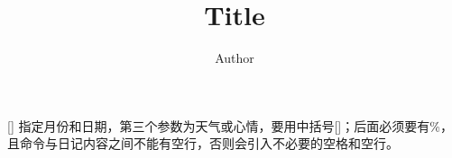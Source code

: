 \documentclass{diary}
\author{Author}
\title{Title}
\begin{document}
\maketitle

[\windy]%
指定月份和日期，第三个参数为天气或心情，要用中括号[]；后面必须要有\%，且命令与日记内容之间不能有空行，否则会引入不必要的空格和空行。
\end{document}
